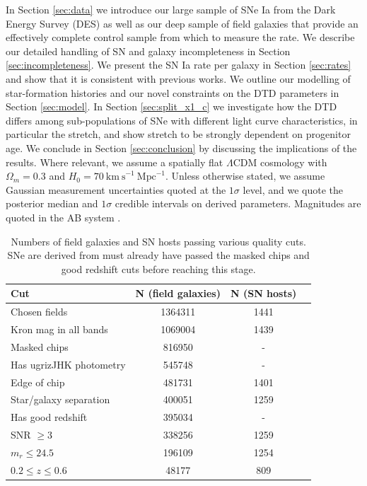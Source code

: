 \documentclass[fleqn,usenatbib]{mnras}
\begin{document}
In Section \ref{sec:data} we introduce our large sample of SNe Ia from the Dark Energy Survey (DES) as well as our deep sample of field galaxies that provide an effectively complete control sample from which to measure the rate. We describe our detailed handling of SN and galaxy incompleteness in Section \ref{sec:incompleteness}. We present the SN Ia rate per galaxy in Section \ref{sec:rates} and show that it is consistent with previous works. We outline our modelling of star-formation histories and our novel constraints on the DTD parameters in Section \ref{sec:model}. In Section \ref{sec:split_x1_c} we investigate how the DTD differs among sub-populations of SNe with different light curve characteristics, in particular the stretch, and show stretch to be strongly dependent on progenitor age. We conclude in Section \ref{sec:conclusion} by discussing the implications of the results.
Where relevant, we assume a spatially flat $\Lambda$CDM cosmology with $\Omega_m = 0.3$ and $H_0 = 70 \mathrm{~km~s}^{-1}~\mathrm{Mpc}^{-1}$. Unless otherwise stated, we assume Gaussian measurement uncertainties quoted at the $1\sigma$ level, and we quote the posterior median and $1\sigma$ credible intervals on derived parameters. Magnitudes are quoted in the AB system \citep{Oke1983}.


\begin{table}
	\centering
	\caption{Numbers of field galaxies and SN hosts passing various quality cuts. SNe are derived from must already have passed the masked chips and good redshift cuts before reaching this stage.}
	\label{tab:cuts}
	\begin{tabular}{lccr} %
		\hline
		Cut & N (field galaxies)  & N (SN hosts)\\
		\hline
		Chosen fields & 1364311  & 1441\\
	    Kron mag in all bands & 1069004  & 1439 \\
	    Masked chips & 816950  & - \\
	    Has ugrizJHK photometry & 545748  & -\\
	    Edge of chip & 481731 & 1401 \\
	    Star/galaxy separation & 400051 &  1259\\
	    Has good redshift & 395034 & - \\
	    SNR $\geq 3$& 338256  & 1259 \\
	    $m_r \leq 24.5$ & 196109 &  1254 \\
	    $0.2 \leq z \leq 0.6$ & 48177 & 809\\ 
	    
		\hline
	\end{tabular}
\end{table}
\end{document}
